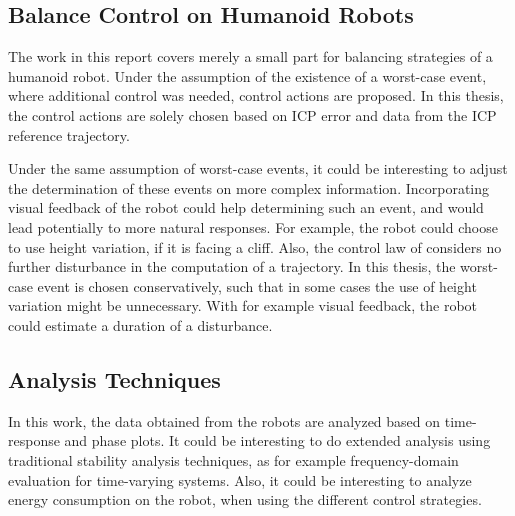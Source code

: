\subsection{Balance Control on Humanoid Robots}
The work in this report covers merely a small part for balancing strategies of a humanoid robot. Under the assumption of the existence of a worst-case event, where additional control was needed, control actions are proposed. In this thesis, the control actions are solely chosen based on \ac{ICP} error and data from the \ac{ICP} reference trajectory.

Under the same assumption of worst-case events, it could be interesting to adjust the determination of these events on more complex information. Incorporating visual feedback of the robot could help determining such an event, and would lead potentially to more natural responses. For example, the robot could choose to use height variation, if it is facing a cliff. Also, the control law of \cite{caron2018balance} considers no further disturbance in the computation of a trajectory. In this thesis, the worst-case event is chosen conservatively, such that in some cases the use of height variation might be unnecessary. With for example visual feedback, the robot could estimate a duration of a disturbance.
\subsection{Analysis Techniques}
In this work, the data obtained from the robots are analyzed based on time-response and phase plots. It could be interesting to do extended analysis using traditional stability analysis techniques, as for example frequency-domain evaluation for time-varying systems.  Also, it could be interesting to analyze energy consumption on the robot, when using the different control strategies.